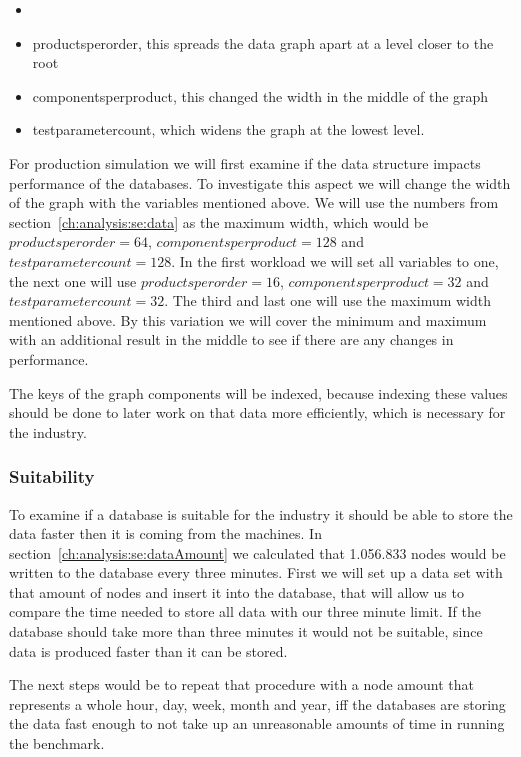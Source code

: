 \begin{itemize}
  \item {}
  \item productsperorder, this spreads the data graph apart at a level closer to the root
  \item componentsperproduct, this changed the width in the middle of the graph
  \item testparametercount, which widens the graph at the lowest level.
\end{itemize}

For production simulation we will first examine if the data structure impacts performance of the databases.
To investigate this aspect we will change the width of the graph with the variables mentioned above.
We will use the numbers from section~\ref{ch:analysis:se:data} as the maximum width,
which would be $ productsperorder = 64 $, \linebreak
$ componentsperproduct = 128 $ and $ testparametercount = 128 $.
In the first workload we will set all variables to one,
the next one will use $ productsperorder = 16 $, $ componentsperproduct = 32 $ and $ testparametercount = 32 $.
The third and last one will use the maximum width mentioned above.
By this variation we will cover the minimum and maximum with an additional result in the middle to see if there are any changes in performance.

The keys of the graph components will be indexed,
because indexing these values should be done to later work on that data more efficiently,
which is necessary for the industry.

\subsubsection{Suitability}
To examine if a database is suitable for the industry it should be able to store the data faster then it is coming from the machines.
In section~\ref{ch:analysis:se:dataAmount} we calculated that 1.056.833 nodes would be written to the database every three minutes.
First we will set up a data set with that amount of nodes and insert it into the database,
that will allow us to compare the time needed to store all data with our three minute limit.
If the database should take more than three minutes it would not be suitable,
since data is produced faster than it can be stored.

The next steps would be to repeat that procedure with a node amount that represents a whole hour, day, week, month and year,
iff the databases are storing the data fast enough to not take up an unreasonable amounts of time in running the benchmark.

